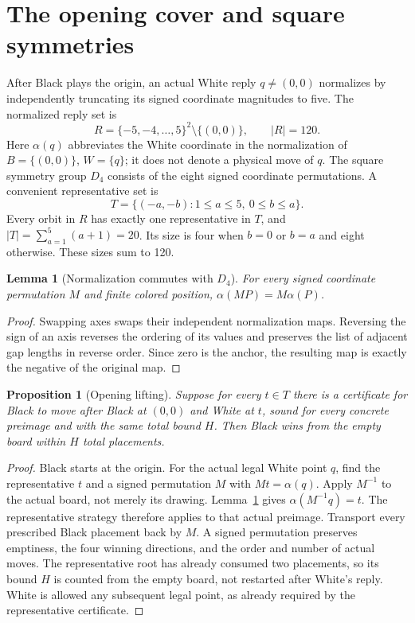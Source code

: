 \documentclass[11pt]{article}
\newtheorem{lemma}[theorem]{Lemma}
\newtheorem{proposition}[theorem]{Proposition}
\theoremstyle{definition}
\theoremstyle{remark}
\newcommand{\A}{\alpha}
\begin{document}
\section{The opening cover and square symmetries}
\label{sec:opening}
After Black plays the origin, an actual White reply $q\ne(0,0)$ normalizes
by independently truncating its signed coordinate magnitudes to five.
The normalized reply set is
\[
 R=\{-5,-4,\ldots,5\}^2\setminus\{(0,0)\},\qquad |R|=120.
\]
Here $\A(q)$ abbreviates the White coordinate in the normalization of
$B=\{(0,0)\}$, $W=\{q\}$; it does not denote a physical move of $q$.
The square symmetry group $D_4$ consists of the eight signed coordinate
permutations. A convenient representative set is
\begin{equation}
 \label{eq:reps}
 T=\{(-a,-b):1\leq a\leq5,\ 0\leq b\leq a\}.
\end{equation}
Every orbit in $R$ has exactly one representative in $T$, and
$|T|=\sum_{a=1}^5(a+1)=20$. Its size is four when $b=0$ or $b=a$ and
eight otherwise. These sizes sum to 120.

\begin{lemma}[Normalization commutes with $D_4$]
\label{lem:d4}
For every signed coordinate permutation $M$ and finite colored position,
$\A(MP)=M\A(P)$.
\end{lemma}
\begin{proof}
Swapping axes swaps their independent normalization maps. Reversing the
sign of an axis reverses the ordering of its values and preserves the
list of adjacent gap lengths in reverse order. Since zero is the anchor,
the resulting map is exactly the negative of the original map.
\end{proof}

\begin{proposition}[Opening lifting]
\label{prop:opening}
Suppose for every $t\in T$ there is a certificate for Black to move after
Black at $(0,0)$ and White at $t$, sound for every concrete preimage and
with the same total bound $H$. Then Black wins from the empty board within
$H$ total placements.
\end{proposition}
\begin{proof}
Black starts at the origin. For the actual legal White point $q$, find
the representative $t$ and a signed permutation $M$ with $Mt=\A(q)$.
Apply $M^{-1}$ to the actual board, not merely its drawing.
Lemma~\ref{lem:d4} gives $\A(M^{-1}q)=t$. The representative strategy
therefore applies to that actual preimage. Transport every prescribed
Black placement back by $M$. A signed permutation preserves emptiness,
the four winning directions, and the order and number of actual moves.
The representative root has already consumed two placements, so its
bound $H$ is counted from the empty board, not restarted after White's
reply. White is allowed any subsequent legal point, as already required
by the representative certificate.
\end{proof}
\end{document}
